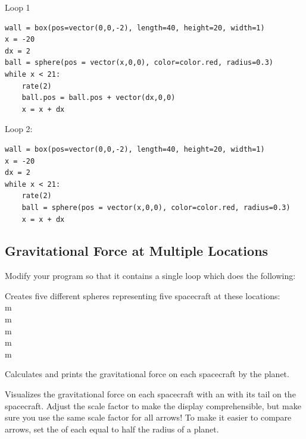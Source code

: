 \documentclass[11pt]{article}
\begin{document}
 
Loop 1

\color{CodeColor}
\begin{Verbatim}[frame=single]  
wall = box(pos=vector(0,0,-2), length=40, height=20, width=1)
x = -20
dx = 2
ball = sphere(pos = vector(x,0,0), color=color.red, radius=0.3)
while x < 21:
    rate(2)
    ball.pos = ball.pos + vector(dx,0,0)
    x = x + dx
\end{Verbatim}
\color{black}

Loop 2:

\color{CodeColor}
\begin{Verbatim}[frame=single]
wall = box(pos=vector(0,0,-2), length=40, height=20, width=1)
x = -20
dx = 2
while x < 21:
    rate(2)
    ball = sphere(pos = vector(x,0,0), color=color.red, radius=0.3)
    x = x + dx
\end{Verbatim}
\color{black}


\subsection{Gravitational Force at Multiple Locations}

Modify your program so that it contains a single \while loop which does the following:\\

\begin{compactitem}[\color{MIRed}$\Rightarrow$]
\item Creates five different spheres representing five spacecraft at these locations:\\
 m\\
 m\\
 m\\
 m\\
 m\\
\item Calculates and prints the gravitational force on each spacecraft by the planet.
\item Visualizes the gravitational force on each spacecraft with an  with its tail on the spacecraft. 
Adjust the scale factor to make the display comprehensible, but make sure you use the same scale factor for all arrows! 
To make it easier to compare arrows, set the  of each  equal to half the radius of a planet.\\
\end{compactitem}
\end{document}
